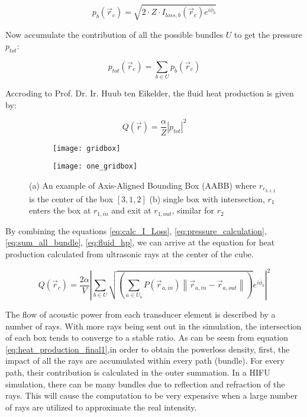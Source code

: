 \begin{equation} \label{eq:pressure_calculation}
    p_b(\vec{r}_c)=\sqrt{2\cdot Z\cdot I_{loss,b}(\vec{r}_c)e^{i\bar{\phi}_b}}
\end{equation}

Now accumulate the contribution of all the possible bundles $U$ to get the pressure $p_{tot}$:

\begin{equation} \label{eq:sum_all_bundle}
    p_{tot}(\vec{r}_c)=\sum_{b \in U}p_b(\vec{r}_c)
\end{equation}

Accroding to Prof. Dr. Ir. Huub ten Eikelder, the fluid heat production is given by:

\begin{equation} \label{eq:fluid_hp}
    Q(\vec{r})=\frac{\alpha}{Z}|p_{tot}|^2
\end{equation}

\begin{figure}
    \centering
    \begin{subfigure}[b]{0.45\textwidth}
        \texttt{[image: gridbox]}
        \caption{}
        \label{fig:gridbox}
    \end{subfigure}
    \begin{subfigure}[b]{0.5\textwidth}
        \texttt{[image: one\_gridbox]}
        \caption{}
        \label{fig:one_gridbox}
    \end{subfigure}
    \caption{(a) An example of Axis-Aligned Bounding Box (AABB) where $r_{c_{3,1,2}}$ is the center of the box $[3,1,2]$ (b) single box with intersection, $r_1$ enters the box at $r_{1,in}$ and exit at $r_{1,out}$, similar for $r_2$}
\end{figure}

By combining the equations \ref{eq:calc_I_Loss}, \ref{eq:pressure_calculation}, \ref{eq:sum_all_bundle}, \ref{eq:fluid_hp}, we can arrive at the equation for heat production calculated from ultrasonic rays at the center of the cube.

\begin{equation} \label{eq:heat_production_final1}
    Q(\vec{r}_c)=\frac{2\alpha}{V}\left|\sum_{b \in U}\sqrt{(\sum_{a \in U_b}P(\vec{r}_{a,in})\left\|\vec{r}_{a,in}-\vec{r}_{a,out}\right\|)} e^{i\bar{\phi}_b}\right|^2
\end{equation}

The flow of acoustic power from each transducer element is described by a number of rays\cite{sonalleve}. With more rays being sent out in the simulation, the intersection of each box tends to converge to a stable ratio. As can be seem from equation \ref{eq:heat_production_final1},in order to obtain the powerloss density, first, the impact of all the rays are accumulated within every path (bundle). For every path, their contribution is calculated in the outer summation. In a HIFU simulation, there can be many bundles due to reflection and refraction of the rays. This will cause the computation to be very expensive when a large number of rays are utilized to approximate the real intensity. 

